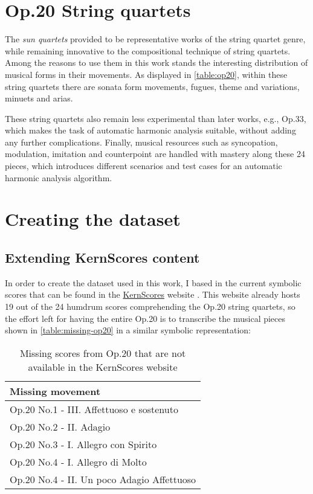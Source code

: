 \section{Op.20 String quartets}
The \emph{sun quartets} provided to be representative works of the string quartet genre, while remaining innovative to the compositional technique of string quartets. Among the reasons to use them in this work stands the interesting distribution of musical forms in their movements. As displayed in \autoref{table:op20}, within these string quartets there are sonata form movements, fugues, theme and variations, minuets and arias.

These string quartets also remain less experimental than later works, e.g., Op.33, which makes the task of automatic harmonic analysis suitable, without adding any further complications. Finally, musical resources such as syncopation, modulation, imitation and counterpoint are handled with mastery along these 24 pieces, which introduces different scenarios and test cases for an automatic harmonic analysis algorithm.

\section{Creating the dataset}
\subsection{Extending KernScores content}
In order to create the dataset used in this work, I based in the current symbolic scores that can be found in the \href{http://kern.ccarh.org/}{KernScores} website \cite{kernscores}. This website already hosts 19 out of the 24 humdrum scores comprehending the Op.20 string quartets, so the effort left for having the entire Op.20 is to transcribe the musical pieces shown in \autoref{table:missing-op20} in a similar symbolic representation:

\begin{table}[]
\centering
\begin{tabular}{|l|}
\hline
Missing movement \\ \hline
Op.20 No.1 - III. Affettuoso e sostenuto \\ \hline
Op.20 No.2 - II. Adagio \\ \hline
Op.20 No.3 - I. Allegro con Spirito \\ \hline
Op.20 No.4 - I. Allegro di Molto \\ \hline
Op.20 No.4 - II. Un poco Adagio Affettuoso \\ \hline
\end{tabular}
\caption{Missing scores from Op.20 that are not available in the KernScores website}
\label{table:missing-op20}
\end{table}

